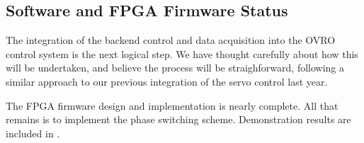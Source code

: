 % 
% 
% 





\clearpage


\clearpage
\subsection{Software and FPGA Firmware Status}

The integration of the backend control and data acquisition into the OVRO control system is the next logical step. We have thought carefully about how this will be undertaken, and believe the process will be straighforward, following a similar approach to our previous integration of the servo control last year.

The FPGA firmware design and implementation is nearly complete. All that remains is to implement the phase switching scheme. Demonstration results are included in .

